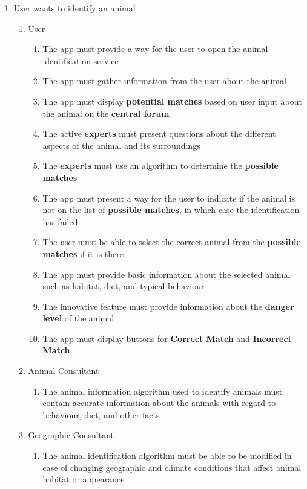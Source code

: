 \documentclass[]{article}
\begin{document}
%
\begin{enumerate}[{BE}1.]
	\item User wants to identify an animal
	\begin{enumerate}[{VP1}.1]
		\item User
			\begin{enumerate}
				\item The app must provide a way for the user to open the animal identification service
				\item The app must gather information from the user about the animal
				\item The app must display \textbf{potential matches} based on user input about the animal on the \textbf{central forum}
				\item The active \textbf{experts} must present questions about the different aspects of the animal and its surroundings
				\item The \textbf{experts} must use an algorithm to determine the \textbf{possible matches}
				\item The app must present a way for the user to indicate if the animal is not on the list of \textbf{possible matches}, in which case the identification has failed
				\item The user must be able to select the correct animal from the \textbf{possible matches} if it is there
				\item The app must provide basic information about the selected animal such as habitat, diet, and typical behaviour
				\item The innovative feature must provide information about the \textbf{danger level} of the animal
				\item The app must display buttons for \textbf{Correct Match} and \textbf{Incorrect Match}
			\end{enumerate}
		\item Animal Consultant
			\begin{enumerate}
				\item The animal information algorithm used to identify animals must contain accurate information about the animals with regard to behaviour, diet, and other facts
			\end{enumerate}
		\item Geographic Consultant
			\begin{enumerate}
				\item The animal identification algorithm must be able to be modified in case of changing geographic and climate conditions that affect animal habitat or appearance
			\end{enumerate}
	\end{enumerate}



\end{enumerate}
\end{document}
